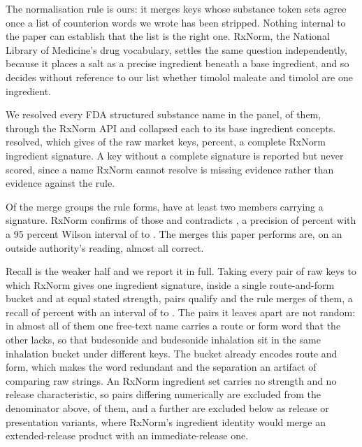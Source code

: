 \documentclass[pdflatex,sn-vancouver-num,Numbered]{sn-jnl}
\begin{document}
The normalisation rule is ours: it merges keys whose substance token sets agree once a list of
counterion words we wrote has been stripped. Nothing internal to the paper can establish that
the list is the right one. RxNorm, the National Library of Medicine's drug vocabulary, settles
the same question independently, because it places a salt as a precise ingredient beneath a
base ingredient, and so decides without reference to our list whether timolol maleate and
timolol are one ingredient.

We resolved every FDA structured substance name in the panel, \nRxSub of them, through the
RxNorm API and collapsed each to its base ingredient concepts. \nRxSubResolved resolved, which
gives \nRxKeysResolved of the \nRxKeys raw market keys, \nRxKeysResolvedPct percent, a complete
RxNorm ingredient signature. A key without a complete signature is reported but never scored,
since a name RxNorm cannot resolve is missing evidence rather than evidence against the rule.

Of the \nRxGroups merge groups the rule forms, \nRxScored have at least two members carrying a
signature. RxNorm confirms \nRxConfirmed of those and contradicts \nRxContradictedW, a precision
of \nRxPrec percent with a 95 percent Wilson interval of \nRxPrecLo to \nRxPrecHi. The merges
this paper performs are, on an outside authority's reading, almost all correct.

Recall is the weaker half and we report it in full. Taking every pair of raw keys to which
RxNorm gives one ingredient signature, inside a single route-and-form bucket and at equal
stated strength, \nRxPairsEligible pairs qualify and the rule merges \nRxPairsMerged of them,
a recall of \nRxRecall percent with an interval of \nRxRecallLo to \nRxRecallHi. The
\nRxPairsMissed pairs it leaves apart are not random: in almost all of them one free-text name
carries a route or form word that the other lacks, so that budesonide and budesonide inhalation
sit in the same inhalation bucket under different keys. The bucket already encodes route and
form, which makes the word redundant and the separation an artifact of comparing raw strings.
An RxNorm ingredient set carries no strength and no release characteristic, so pairs differing
numerically are excluded from the denominator above, \nRxPairsStrength of them, and a further
\nRxPairsRelease are excluded below as release or presentation variants, where RxNorm's
ingredient identity would merge an extended-release product with an immediate-release one.
\end{document}
